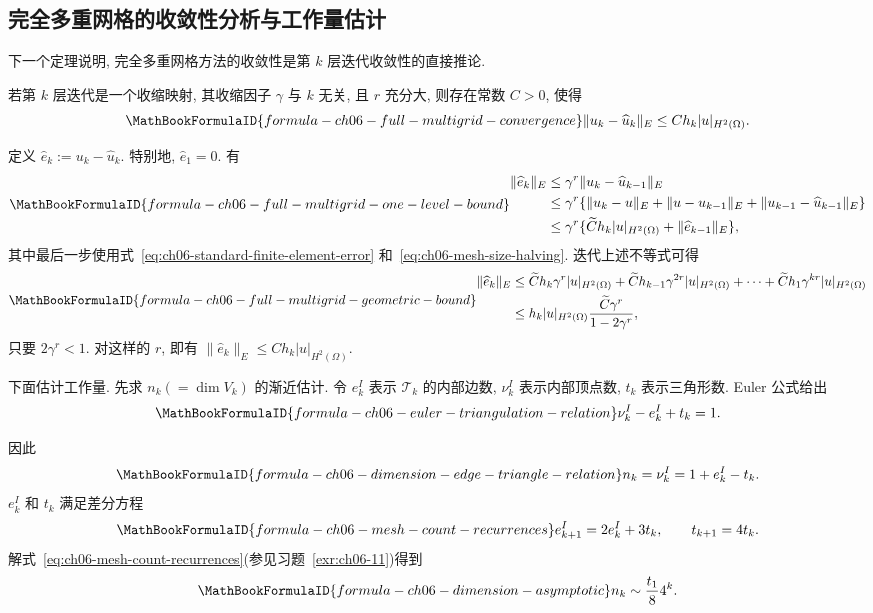 \subsection{完全多重网格的收敛性分析与工作量估计}
\label{sec:ch06-full-multigrid-convergence-work}
\setcounter{thmcount}{0}
\setcounter{equation}{0}

下一个定理说明, 完全多重网格方法的收敛性是第 $k$ 层迭代收敛性的直接推论.

\begin{Theorem}[完全多重网格收敛性]
\label{thm:ch06-full-multigrid-convergence}
若第 $k$ 层迭代是一个收缩映射, 其收缩因子 $\gamma$ 与 $k$ 无关, 且 $r$ 充分大, 则存在常数 $C>0$, 使得
\[
\MathBookFormulaID{formula-ch06-full-multigrid-convergence}
\|u_k-\widehat u_k\|_E\leq Ch_k|u|_{H^2(\Omega)}.
\]
\end{Theorem}
\begin{Proof}
定义 $\widehat e_k:=u_k-\widehat u_k$. 特别地, $\widehat e_1=0$. 有
\[
\MathBookFormulaID{formula-ch06-full-multigrid-one-level-bound}
\begin{aligned}
\|\widehat e_k\|_E
&\leq\gamma^r\|u_k-\widehat u_{k-1}\|_E\\
&\leq\gamma^r\{\|u_k-u\|_E+\|u-u_{k-1}\|_E
 +\|u_{k-1}-\widehat u_{k-1}\|_E\}\\
&\leq\gamma^r\{\widetilde C h_k|u|_{H^2(\Omega)}
 +\|\widehat e_{k-1}\|_E\},
\end{aligned}
\]
其中最后一步使用式~\eqref{eq:ch06-standard-finite-element-error} 和~\eqref{eq:ch06-mesh-size-halving}. 迭代上述不等式可得
\[
\MathBookFormulaID{formula-ch06-full-multigrid-geometric-bound}
\begin{aligned}
\|\widehat e_k\|_E
&\leq\widetilde Ch_k\gamma^r|u|_{H^2(\Omega)}
 +\widetilde Ch_{k-1}\gamma^{2r}|u|_{H^2(\Omega)}+\cdots
 +\widetilde Ch_1\gamma^{kr}|u|_{H^2(\Omega)}\\
&\leq h_k|u|_{H^2(\Omega)}\frac{\widetilde C\gamma^r}{1-2\gamma^r},
\end{aligned}
\]
只要 $2\gamma^r<1$. 对这样的 $r$, 即有 $\|\widehat e_k\|_E\leq Ch_k|u|_{H^2(\Omega)}$.
\end{Proof}

下面估计工作量. 先求 $n_k(=\dim V_k)$ 的渐近估计. 令 $e_k^I$ 表示 $\mathcal T_k$ 的内部边数, $\nu_k^I$ 表示内部顶点数, $t_k$ 表示三角形数. Euler 公式给出
\[
\MathBookFormulaID{formula-ch06-euler-triangulation-relation}
\nu_k^I-e_k^I+t_k=1.
\]

因此
\[
\MathBookFormulaID{formula-ch06-dimension-edge-triangle-relation}
n_k=\nu_k^I=1+e_k^I-t_k.
\]
$e_k^I$ 和 $t_k$ 满足差分方程
\begin{equation}
\MathBookFormulaID{formula-ch06-mesh-count-recurrences}
\label{eq:ch06-mesh-count-recurrences}
e_{k+1}^I=2e_k^I+3t_k,
\qquad
t_{k+1}=4t_k.
\end{equation}
解式~\eqref{eq:ch06-mesh-count-recurrences}(参见习题~\ref{exr:ch06-11})得到
\begin{equation}
\MathBookFormulaID{formula-ch06-dimension-asymptotic}
\label{eq:ch06-dimension-asymptotic}
n_k\sim\frac{t_1}{8}4^k.
\end{equation}

